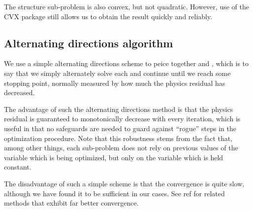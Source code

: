 The structure sub-problem is also convex, but not quadratic.
However, use of the CVX package still allows us to obtain the result
    quickly and reliably.

\subsection{Alternating directions algorithm}
We use a simple alternating directions scheme 
    to peice together  and ,
    which is to say that we simply
    alternately solve each and continue until we reach some stopping point,
    normally measured by how much the physics residual has decreased.

The advantage of such the alternating directions method
    is that the physics residual is guaranteed to
    monotonically decrease with every iteration,
    which is useful in that no safeguards
    are needed to guard against ``rogue'' steps
    in the optimization procedure.
Note that this robustness stems from the fact that,
    among other things,
    each sub-problem does not rely on previous values of 
    the variable which is being optimized,
    but only on the variable which is held constant.

The disadvantage of such a simple scheme is that 
    the convergence is quite slow,
    although we have found it to be sufficient in our cases.
See ref %
    for related methods that exhibit far better convergence.
